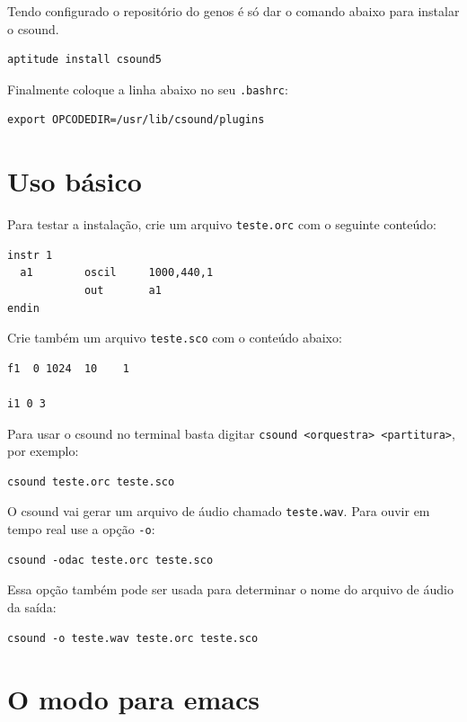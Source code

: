 \documentclass[12pt,brazil]{book}
\begin{document}
Tendo configurado o repositório do genos é só dar o comando abaixo
para instalar o csound.

\begin{verbatim}
aptitude install csound5
\end{verbatim}

Finalmente coloque a linha abaixo no seu \texttt{.bashrc}:

\begin{verbatim}
export OPCODEDIR=/usr/lib/csound/plugins
\end{verbatim}

\section{Uso básico}
\label{sec:uso-basico-2}

Para testar a instalação, crie um arquivo \texttt{teste.orc} com o seguinte
conteúdo:

\begin{verbatim}
instr 1
  a1        oscil     1000,440,1
            out       a1       
endin
\end{verbatim}

Crie também um arquivo \texttt{teste.sco} com o conteúdo abaixo:

\begin{verbatim}
f1  0 1024  10    1

i1 0 3
\end{verbatim}

Para usar o csound no terminal basta digitar \texttt{csound
  <orquestra> <partitura>}, por exemplo:

\begin{verbatim}
csound teste.orc teste.sco
\end{verbatim}

O csound vai gerar um arquivo de áudio chamado \texttt{teste.wav}.
Para ouvir em tempo real use a opção \texttt{-o}:

\begin{verbatim}
csound -odac teste.orc teste.sco
\end{verbatim}

Essa opção também pode ser usada para determinar o nome do arquivo de
áudio da saída:

\begin{verbatim}
csound -o teste.wav teste.orc teste.sco
\end{verbatim}

\section{O modo para emacs}
\label{sec:o-modo-para}
\end{document}

